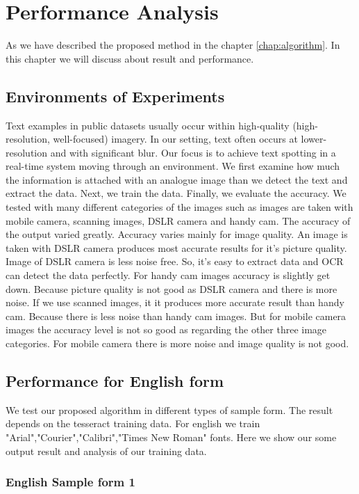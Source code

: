 \chapter {Performance Analysis}
\label{chap:result}
As we have described the proposed method in the chapter \ref{chap:algorithm}. In this chapter we will discuss about result and performance.
\section{Environments of Experiments}
Text examples in public datasets usually occur within high-quality (high-resolution, well-focused) imagery. In our setting, text often occurs at lower-resolution and with significant blur. Our focus is to achieve text spotting in a real-time system moving through an environment. We first examine how much the information is attached with an analogue image than we detect the text and extract the data. Next, we train the data. Finally, we evaluate the accuracy.
We tested with many different categories of the images such as images are taken with mobile camera, scanning images, DSLR camera and handy cam. The accuracy of the output varied greatly. Accuracy varies mainly for image quality. An image is taken with DSLR camera produces most accurate results for it's picture quality. Image of DSLR camera is less noise free. So, it’s easy to extract data and OCR can detect the data perfectly. For handy cam images accuracy is slightly get down. Because picture quality is not good as DSLR camera and there is more noise.
If we use scanned images, it it produces more accurate result than handy cam. Because there is less noise than handy cam images. But for mobile camera images the accuracy level is not so good as regarding the other three image categories. For mobile camera there is more noise and image quality is not good.   

\section{Performance for English form}
We test our proposed algorithm in different types of sample form. The result depends on the tesseract training data. For english we train "Arial","Courier","Calibri","Times New Roman" fonts. Here we show our some output result and analysis of our training data.
\subsection{English Sample form 1}

